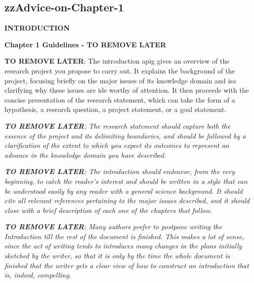 \pagebreak
\begin{tcolorbox}

\section{zzAdvice-on-Chapter-1}

\textbf{INTRODUCTION}
\vspace*{1\baselineskip}

\textbf{Chapter 1 Guidelines - TO REMOVE LATER}	
\vspace*{1\baselineskip}
	
\textbf{TO REMOVE LATER}: The  introduction \gls{apig} gives an overview of the research project you propose to carry out. It explains the background of the project, focusing briefly on the major issues of its knowledge domain and \gls{isa} clarifying why these issues are \gls{ide} worthy of attention. It then proceeds with the concise presentation of the research statement, which can take the form of a hypothesis, a research question, a project statement, or a goal statement.
\vspace*{1\baselineskip}

\textit{\textbf{TO REMOVE LATER}: The research statement should capture both the essence of the project and its delimiting boundaries, and should be followed by a clarification of the extent to which you expect its outcomes to represent an advance in the knowledge domain you have described.}
\vspace*{1\baselineskip}

\textit{\textbf{TO REMOVE LATER}: The introduction should endeavor, from the very beginning, to catch the reader's interest and should be written in a style that can be understood easily by any reader with a general science background. It should cite all relevant references pertaining to the major issues described,  and it should close with a brief description of each one of the chapters that follow.}
\vspace*{1\baselineskip}

\textit{\textbf{TO REMOVE LATER}: Many authors prefer to postpone writing the Introduction till the rest of the document is finished. This makes a lot of sense, since the act of writing tends to introduces many changes in the plans initially sketched by the writer, so that it is only by the time the whole document is finished that the writer gets a clear view of how to construct an introduction that is, indeed, compelling.}
\vspace*{1\baselineskip}


\end{tcolorbox}

\begin{tcolorbox}
	

\end{tcolorbox}

